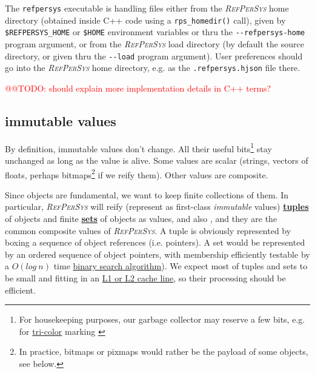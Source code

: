 \documentclass[11pt,a4paper,svgnames]{article}
\newcommand{\RefPerSys}{{\textit{\textsc{RefPerSys}}}}
\begin{document}
The \texttt{refpersys} executable is handling files either from the
{\RefPerSys} home directory (obtained inside C++ code using
a \texttt{rps\_homedir()} call), given by \texttt{\$REFPERSYS\_HOME} or
\texttt{\$HOME} environment variables or thru the
\texttt{-{-}refpersys-home} program argument, or from the {\RefPerSys}
load directory (by default the source directory, or given thru the
\texttt{-{-}load} program argument). User preferences should go into the
       {\RefPerSys} home directory, e.g. as the
       \texttt{.refpersys.hjson} file there.

\textcolor{red}{@@TODO: should explain more implementation details in C++ terms?}


\medskip

\subsection{immutable values}
\label{subsec:immutable-values}

By definition, immutable values don't change. All their useful
bits\footnote{For housekeeping purposes, our garbage collector may
reserve a few bits, e.g. for
\href{https://www.memorymanagement.org/glossary/t.html}{tri-color}
marking \cite{wilson:1992:uniprocessorgc}} stay unchanged as long as
the value is alive. Some values are scalar (strings, vectors of
floats, perhaps bitmaps\footnote{In practice, bitmaps or pixmaps would
rather be the payload of some objects, see below.} if we reify
them). Other values are composite.

Since objects are fundamental, we want to keep finite collections of
them. In particular, {\RefPerSys} will reify (represent as first-class
\emph{immutable} values)
\href{https://en.wikipedia.org/wiki/Tuple}{\textbf{tuples}}
 of objects and finite
\href{https://en.wikipedia.org/wiki/Set_(abstract_data_type)}{\textbf{sets}}
of objects as values, and also , and they are the common composite
values of \RefPerSys. A tuple is obviously represented by boxing a
sequence of object references (i.e. pointers). A set would be
represented by an ordered sequence of object pointers, with membership
efficiently testable by a
\href{https://en.wikipedia.org/wiki/Time\_complexity}{$O(log~ n)$}
time
\href{https://en.wikipedia.org/wiki/Binary_search_algorithm}{binary
  search algorithm}). We expect most of tuples and sets to be small
and fitting in an
\href{https://en.wikipedia.org/wiki/Cache\_hierarchy}{L1 or L2 cache
  line}, so their processing should be efficient.
\end{document}
